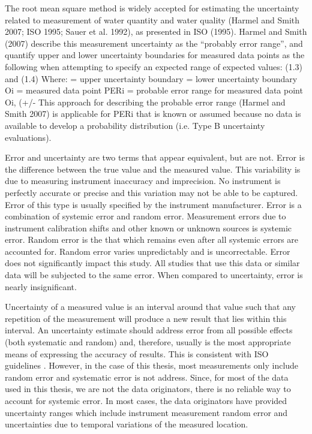 \begin{linenumbers}
The root mean square method is widely accepted for estimating the uncertainty related to measurement of water quantity and water quality (Harmel and Smith 2007; ISO 1995; Sauer et al. 1992), as presented in ISO (1995).  Harmel and Smith (2007) describe this measurement uncertainty as the “probably error range”, and quantify upper and lower uncertainty boundaries for measured data points as the following when attempting to specify an expected range of expected values:
(1.3)
and
(1.4)
Where:	 = upper uncertainty boundary
= lower uncertainty boundary
Oi = measured data point
PERi = probable error range for measured data point Oi, (+/- %
This approach for describing the probable error range (Harmel and Smith 2007) is applicable for PERi that is known or assumed because no data is available to develop a probability distribution (i.e. Type B uncertainty evaluations).










Error and uncertainty are two terms that appear equivalent, but are not.  Error is the difference between the true value and the measured value.  This variability is due to measuring instrument inaccuracy and imprecision.  No instrument is perfectly accurate or precise and this variation may not be able to be captured.  Error of this type is usually specified by the instrument manufacturer.  Error is a combination of systemic error and random error.  Measurement errors due to instrument calibration shifts and other known or unknown sources is systemic error.  Random error is the that which remains even after all systemic errors are accounted for.  Random error varies unpredictably and is uncorrectable.  Error does not significantly impact this study.  All studies that use this data or similar data will be subjected to the same error.  When compared to uncertainty, error is nearly insignificant.

Uncertainty of a measured value is an interval around that value such that any repetition of the measurement will produce a new result that lies within this interval.  An uncertainty estimate should address error from all possible effects (both systematic and random) and, therefore, usually is the most appropriate means of expressing the accuracy of results.  This is consistent with ISO guidelines .  However, in the case of this thesis, most measurements only include random error and systematic error is not address.  Since, for most of the data used in this thesis, we are not the data originators, there is no reliable way to account for systemic error.  In most cases, the data originators have provided uncertainty ranges which include instrument measurement random error and uncertainties due to temporal variations of the measured location.


\end{linenumbers}
